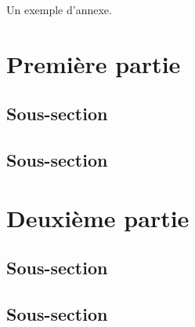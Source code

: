 \label{sec:S_ANN_EX}

Un exemple d'annexe.
\section{Première partie}


\subsection{Sous-section}
\subsection{Sous-section}

\section{Deuxième partie}

\subsection{Sous-section}
\subsection{Sous-section}